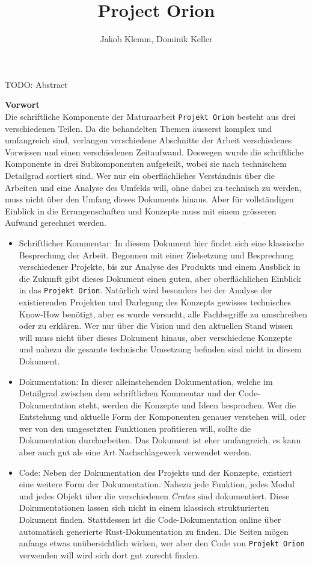 \documentclass[11pt]{article}
\author{Jakob Klemm, Dominik Keller}
\date{}
\title{Project Orion}
\begin{document}
\maketitle
\tableofcontents

\newpage  
\begin{ABSTRACT}
TODO: Abstract
\end{ABSTRACT}
\newpage

\textbf{Vorwort}\\
Die schriftliche Komponente der Maturaarbeit \texttt{Projekt Orion} besteht aus
drei verschiedenen Teilen. Da die behandelten Themen äusserst komplex
und umfangreich sind, verlangen verschiedene Abschnitte der Arbeit
verschiedenes Vorwissen und einen verschiedenen Zeitaufwand. Deswegen
wurde die schriftliche Komponente in drei Subkomponenten aufgeteilt,
wobei sie nach technischem Detailgrad sortiert sind. Wer nur ein
oberflächliches Verständnis über die Arbeiten und eine Analyse des
Umfelds will, ohne dabei zu technisch zu werden, muss nicht über den
Umfang dieses Dokuments hinaus. Aber für vollständigen Einblick in die
Errungenschaften und Konzepte muss mit einem grösseren Aufwand
gerechnet werden.
\begin{itemize}
\item Schriftlicher Kommentar: In diesem Dokument hier findet sich eine
klassische Besprechung der Arbeit. Begonnen mit einer Zielsetzung
und Besprechung verschiedener Projekte, bis zur Analyse des Produkts
und einem Ausblick in die Zukunft gibt dieses Dokument einen guten,
aber oberflächlichen Einblick in das \texttt{Projekt Orion}. Natürlich wird
besonders bei der Analyse der existierenden Projekten und Darlegung
des Konzepts gewisses technisches Know-How benötigt, aber es wurde
versucht, alle Fachbegriffe zu umschreiben oder zu erklären. Wer nur
über die Vision und den aktuellen Stand wissen will muss nicht über
dieses Dokument hinaus, aber verschiedene Konzepte und nahezu die
gesamte technische Umsetzung befinden sind nicht in diesem Dokument.
\item Dokumentation: In dieser alleinstehenden Dokumentation, welche im
Detailgrad zwischen dem schriftlichen Kommentar und der
Code-Dokumentation steht, werden die Konzepte und Ideen besprochen.
Wer die Entstehung und aktuelle Form der Komponenten genauer
verstehen will, oder wer von den umgesetzten Funktionen profitieren
will, sollte die Dokumentation durcharbeiten. Das Dokument ist eher
umfangreich, es kann aber auch gut als eine Art Nachschlagewerk
verwendet werden.
\item Code: Neben der Dokumentation des Projekts und der Konzepte,
existiert eine weitere Form der Dokumentation. Nahezu jede Funktion,
jedes Modul und jedes Objekt über die verschiedenen \emph{Crates} sind
dokumentiert. Diese Dokumentationen lassen sich nicht in einem
klassisch strukturierten Dokument finden. Stattdessen ist die
Code-Dokumentation online über automatisch generierte
Rust-Dokumentation zu finden. Die Seiten mögen anfangs etwas
unübersichtlich wirken, wer aber den Code von \texttt{Projekt Orion}
verwenden will wird sich dort gut zurecht finden.
\end{itemize}
\newpage
\end{document}
